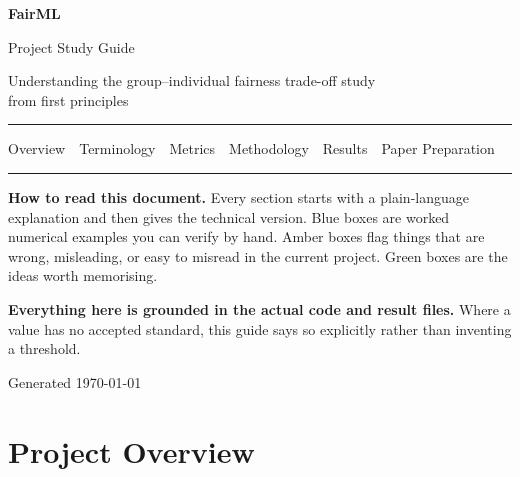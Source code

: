\documentclass[11pt,a4paper]{article}
\begin{document}
\sloppy

\begin{titlepage}
\centering
\vspace*{2.5cm}
{\Huge\bfseries\color{accent} FairML\par}
\vspace{0.5cm}
{\LARGE Project Study Guide\par}
\vspace{0.8cm}
{\large Understanding the group--individual fairness trade-off study\\
from first principles\par}
\vspace{1.4cm}
\rule{0.75\textwidth}{0.8pt}\par
\vspace{0.8cm}
\begin{minipage}{0.8\textwidth}
\centering\large
Overview \,\textbullet\, Terminology \,\textbullet\, Metrics \,\textbullet\,
Methodology \,\textbullet\, Results \,\textbullet\, Paper Preparation
\end{minipage}
\par\vspace{0.8cm}
\rule{0.75\textwidth}{0.8pt}\par
\vfill
\begin{minipage}{0.85\textwidth}
\small
\textbf{How to read this document.} Every section starts with a plain-language
explanation and then gives the technical version. Blue boxes are worked
numerical examples you can verify by hand. Amber boxes flag things that are
wrong, misleading, or easy to misread in the current project. Green boxes are
the ideas worth memorising.

\vspace{4pt}
\textbf{Everything here is grounded in the actual code and result files.}
Where a value has no accepted standard, this guide says so explicitly rather
than inventing a threshold.
\end{minipage}
\vfill
{\small Generated \today\par}
\end{titlepage}

\tableofcontents
\newpage

\section{Project Overview}
\end{document}
